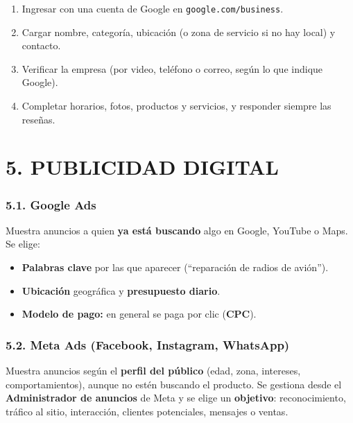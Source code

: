 \begin{enumerate}
  \item Ingresar con una cuenta de Google en \texttt{google.com/business}.
  \item Cargar nombre, categoría, ubicación (o zona de servicio si no hay local) y contacto.
  \item Verificar la empresa (por video, teléfono o correo, según lo que indique Google).
  \item Completar horarios, fotos, productos y servicios, y responder siempre las reseñas.
\end{enumerate}

\section*{5. PUBLICIDAD DIGITAL}

\subsubsection*{5.1. Google Ads}
Muestra anuncios a quien \textbf{ya está buscando} algo en Google, YouTube o Maps. Se elige:
\begin{itemize}
  \item \textbf{Palabras clave} por las que aparecer (``reparación de radios de avión'').
  \item \textbf{Ubicación} geográfica y \textbf{presupuesto diario}.
  \item \textbf{Modelo de pago:} en general se paga por clic (\textbf{CPC}).
\end{itemize}

\subsubsection*{5.2. Meta Ads (Facebook, Instagram, WhatsApp)}
Muestra anuncios según el \textbf{perfil del público} (edad, zona, intereses,
comportamientos), aunque no estén buscando el producto. Se gestiona desde el
\textbf{Administrador de anuncios} de Meta y se elige un \textbf{objetivo}: reconocimiento,
tráfico al sitio, interacción, clientes potenciales, mensajes o ventas.

